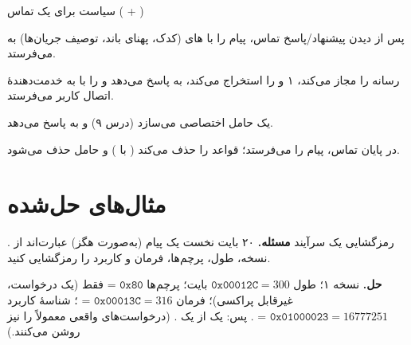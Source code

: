 \documentclass[11pt,a4paper]{article}
\begin{document}
\begin{procedurebox}{سیاست برای یک تماس  ( + )}\label{proc:volte}
\begin{steps}
  \item {} پس از دیدن پیشنهاد/پاسخ  تماس، پیام  را با های
         (کدک، پهنای باند، توصیف جریان‌ها) به  می‌فرستد.
  \item {} رسانه را مجاز می‌کند،  ۱ و  را استخراج می‌کند، به  پاسخ می‌دهد و
         را با  به  خدمت‌دهندهٔ اتصال   کاربر
        می‌فرستد.
  \item {} یک حامل اختصاصی می‌سازد (درس ۹) و به  پاسخ می‌دهد.
  \item در پایان تماس،  پیام  را می‌فرستد؛  قواعد را حذف می‌کند ( با
        ) و حامل حذف می‌شود.
\end{steps}
\end{procedurebox}

\begin{acnfigure}
  \caption{گفت‌وگوهای  و  برای یک تماس  (\cref{proc:volte}).}
  \label{fig:volte}
\end{acnfigure}

\section{مثال‌های حل‌شده}

\begin{examplebox}{رمزگشایی یک سرآیند}\label{ex:decode}
\textbf{مسئله.} ۲۰ بایت نخست یک پیام (به‌صورت هگز) عبارت‌اند از
. نسخه، طول، پرچم‌ها، فرمان و کاربرد را رمزگشایی کنید.

\textbf{حل.} نسخه ۱؛ طول $\mathtt{0x00012C} = 300$ بایت؛ پرچم‌ها $\mathtt{0x80}$ = فقط  (یک درخواست، غیرقابل
پراکسی)؛ فرمان $\mathtt{0x00013C} = 316$ = ؛ شناسهٔ کاربرد $\mathtt{0x01000023} = 16777251$ =
. پس: یک  از یک . (درخواست‌های واقعی  معمولاً  را نیز روشن می‌کنند.)
\end{examplebox}
\end{document}
